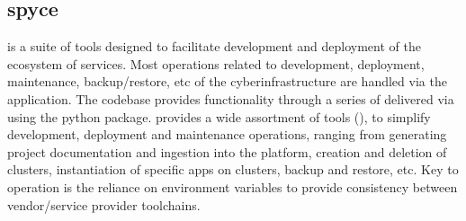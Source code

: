 \documentclass[letterpaper,12pt,english,openany,oneside]{sphinxmanual}
\begin{document}
\sphinxstepscope


\subsection{spyce}
\label{\detokenize{euidev/development/_autosummary/spyce:module-spyce}}\label{\detokenize{euidev/development/_autosummary/spyce:spyce}}\label{\detokenize{euidev/development/_autosummary/spyce::doc}}
\sphinxAtStartPar
{\hyperref[\detokenize{_static/glossary:term-Spyce}]{}} is a suite of tools designed to facilitate development and deployment of the {\hyperref[\detokenize{_static/glossary:term-Water-Wizard}]{}} ecosystem of services. Most operations related to development, deployment, maintenance, backup/restore, etc of the {\hyperref[\detokenize{_static/glossary:term-REON.cc}]{}} cyberinfrastructure are handled via the {\hyperref[\detokenize{_static/glossary:term-RATES}]{}} {\hyperref[\detokenize{_static/glossary:term-Spyce}]{}} application. The {\hyperref[\detokenize{_static/glossary:term-Spyce}]{}} {\hyperref[\detokenize{_static/glossary:term-Python}]{}} codebase provides functionality through a series of   delivered via {\hyperref[\detokenize{_static/glossary:term-CLI}]{}} using the python  package. {\hyperref[\detokenize{_static/glossary:term-Spyce}]{}} provides a wide assortment of tools (), to simplify development, deployment and maintenance operations, ranging from generating project documentation and ingestion into the {\hyperref[\detokenize{_static/glossary:term-Water-Wizard}]{}} platform, creation and deletion of clusters, instantiation of specific apps on clusters, backup and restore, etc. Key to {\hyperref[\detokenize{_static/glossary:term-Spyce}]{}} operation is the reliance on environment variables to provide consistency between vendor/service provider toolchains.
\end{document}

